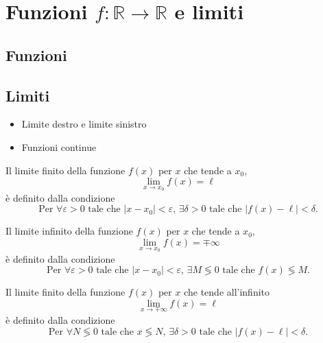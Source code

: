 

\chapter{Funzioni $f:\mathbb{R} \rightarrow \mathbb{R}$ e limiti}

\section{Funzioni}
\begin{definition}
\end{definition}


\section{Limiti}
{\color{red}
\begin{itemize}
    \item Limite destro e limite sinistro
    \item Funzioni continue
\end{itemize}
}
\begin{definition} Il limite finito della funzione $f(x)$  per $x$ che tende a $x_0$,
    \begin{equation}
      \lim_{x \rightarrow x_0} f(x) = \ell
    \end{equation}
    è definito dalla condizione
    \begin{equation}
        \text{Per $\forall \varepsilon > 0$ tale che $|x-x_0| < \varepsilon$, $\exists \delta > 0$ tale che $|f(x) - \ell|< \delta$.}
    \end{equation}
\end{definition}
\begin{definition} Il limite infinito della funzione $f(x)$  per $x$ che tende a $x_0$,
    \begin{equation}
      \lim_{x \rightarrow x_0} f(x) = \mp \infty
    \end{equation}
    è definito dalla condizione
    \begin{equation}
        \text{Per $\forall \varepsilon > 0$ tale che $|x-x_0| < \varepsilon$, $\exists M \lessgtr 0$ tale che $f(x) \lessgtr M$.}
    \end{equation}
\end{definition}
\begin{definition} Il limite finito della funzione $f(x)$ per $x$ che tende all'infinito
    \begin{equation}
      \lim_{x \rightarrow \mp \infty} f(x) = \ell
    \end{equation}
    è definito dalla condizione
    \begin{equation}
        \text{Per $\forall N \lessgtr 0$ tale che $x \lessgtr  N$, $\exists \delta > 0$ tale che $|f(x) - \ell| < \delta$.}
    \end{equation}
\end{definition}
